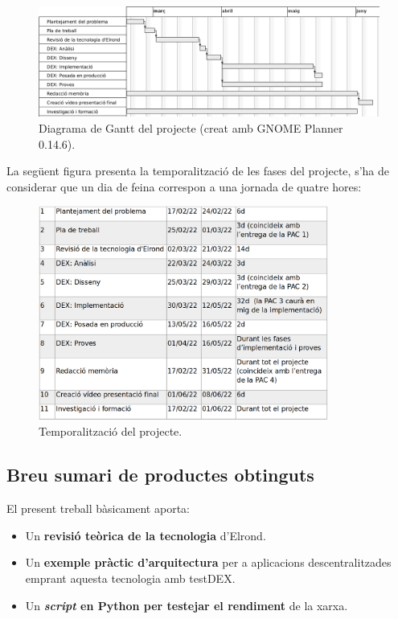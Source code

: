 \documentclass[11pt,a4paper]{article}
\begin{document}
\begin{figure}[h]
\includegraphics[width=1\textwidth]{gantt.png}
\centering
\caption{Diagrama de Gantt del projecte (creat amb GNOME Planner 0.14.6).}
\end{figure}

La següent figura presenta la temporalització de les fases del projecte, s'ha de considerar que un dia de feina correspon a una jornada de quatre hores:
\begin{figure}[h]
\includegraphics[width=0.85\textwidth]{gantttemp.png}
\centering
\caption{Temporalització del projecte.}
\end{figure} 

\subsection{Breu sumari de productes obtinguts}
El present treball bàsicament aporta:
\begin{itemize}
\item Un \textbf{revisió teòrica de la tecnologia} d'Elrond.
\item Un \textbf{exemple pràctic d'arquitectura} per a aplicacions descentralitzades emprant aquesta tecnologia amb testDEX.
\item Un \textbf{\textit{script} en Python per testejar el rendiment} de la xarxa.
\end{itemize}
\end{document}
